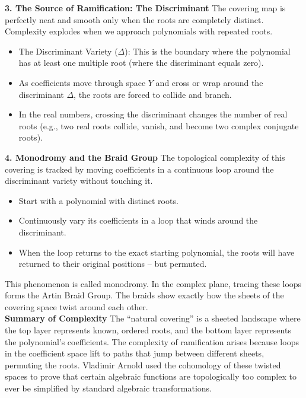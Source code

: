 {\bf 3. The Source of Ramification: The Discriminant}
The covering map is perfectly neat and smooth only when the roots are completely distinct. Complexity explodes when we approach polynomials with repeated roots.
\begin{itemize}
\item[]The Discriminant Variety (\(\Delta \)): This is the boundary where the polynomial has at least one multiple root (where the discriminant equals zero).
\item[]As coefficients move through space \(Y\) and cross or wrap around the discriminant \(\Delta \), the roots are forced to collide and branch.
\item[]In the real numbers, crossing the discriminant changes the number of real roots (e.g., two real roots collide, vanish, and become two complex conjugate roots).
\end{itemize}

{\bf 4. Monodromy and the Braid Group}
The topological complexity of this covering is tracked by moving coefficients in a continuous loop around the discriminant variety without touching it.
\begin{itemize}
\item[]Start with a polynomial with distinct roots.
\item[]Continuously vary its coefficients in a loop that winds around the discriminant.
\item[]When the loop returns to the exact starting polynomial, the roots will have returned to their original positions -- but permuted.
\end{itemize}
This phenomenon is called monodromy. In the complex plane, tracing these loops forms the Artin Braid Group. 
The braids show exactly how the sheets of the covering space twist around each other.\\

{\bf Summary of Complexity}
The ``natural covering'' is a sheeted landscape where the top layer represents known, ordered roots, and the bottom layer represents the polynomial's coefficients. 
The complexity of ramification arises because loops in the coefficient space lift to paths that jump between different sheets, permuting the roots. 
Vladimir Arnold used the cohomology of these twisted spaces to prove that certain algebraic functions are topologically too complex to ever be simplified by standard algebraic transformations.\\


